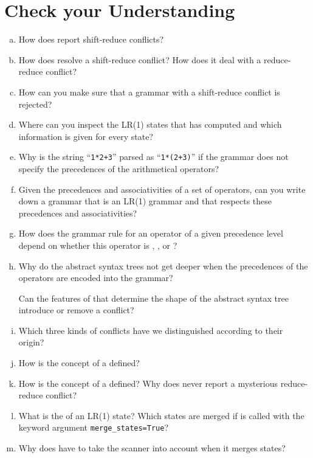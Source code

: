 \section{Check your Understanding}
\begin{enumerate}[(a)]
\item How does  report shift-reduce conflicts?
\item How does  resolve a shift-reduce conflict?  How does it deal with a reduce-reduce
      conflict?
\item How can you make sure that a grammar with a shift-reduce conflict is rejected?
\item Where can you inspect the LR(1) states that  has computed and which information is
      given for every state?
\item Why is the string ``\texttt{1*2+3}'' parsed as ``\texttt{1*(2+3)}'' if the grammar does not
      specify the precedences of the arithmetical operators?
\item Given the precedences and associativities of a set of operators, can you write down a grammar that is an
      LR(1) grammar and that respects these precedences and associativities?
\item How does the grammar rule for an operator of a given precedence level depend on whether this operator is
      , , or ?
\item Why do the abstract syntax trees not get deeper when the precedences of the operators are encoded into the
      grammar?

      Can the features of  that determine the shape of the abstract syntax tree introduce or
      remove a conflict?
\item Which three kinds of conflicts have we distinguished according to their origin?
\item How is the concept of a  defined?
\item How is the concept of a  defined?  Why does 
      never report a mysterious reduce-reduce conflict?
\item What is the  of an LR(1) state?  Which states are merged if  is called with
      the keyword argument \texttt{merge\_states=True}?
\item Why does  have to take the scanner into account when it merges states?
\end{enumerate}

